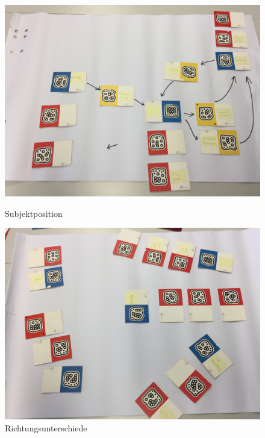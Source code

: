 \begin{figure}[h]
	\centering 
	\begin{minipage}[b]{0.45\textwidth} 
		\includegraphics[width=\textwidth]{figures/03.jpg}
		\caption[Subjektposition]{Subjektposition \protect~\cite{max}}
		\label{fig:subjekt-position} 
	\end{minipage}
	\hfill 
	\begin{minipage}[b]{0.45\textwidth} 
		\includegraphics[width=\textwidth]{figures/17.jpg} 		
		\caption[Richtungsunterschiede]{Richtungsunterschiede \protect~\cite{max}}
		\label{fig:nicht-vertikal} 
	\end{minipage}
\end{figure}

